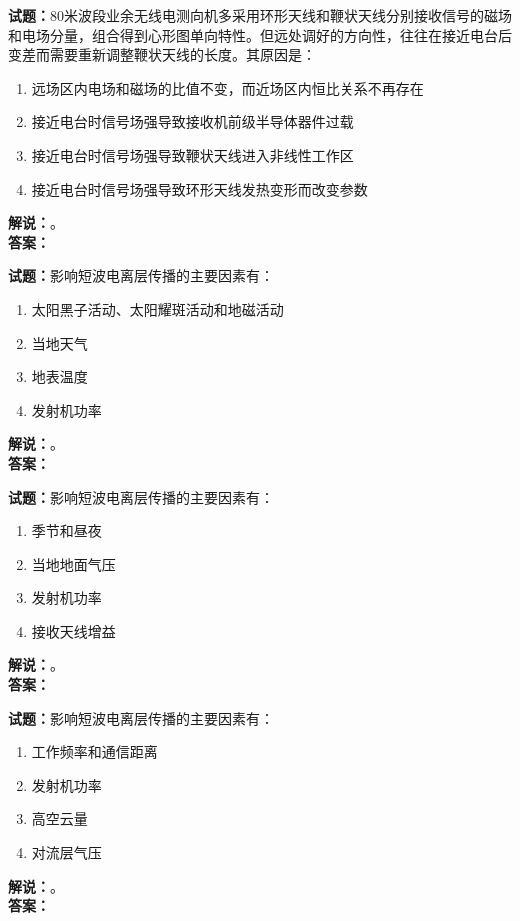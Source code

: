 \documentclass{ctexbook}
\begin{document}
\noindent\textbf{试题：}80米波段业余无线电测向机多采用环形天线和鞭状天线分别接收信号的磁场和电场分量，组合得到心形图单向特性。但远处调好的方向性，往往在接近电台后变差而需要重新调整鞭状天线的长度。其原因是：
\begin{enumerate}[leftmargin=3em]
  \item 远场区内电场和磁场的比值不变，而近场区内恒比关系不再存在
  \item 接近电台时信号场强导致接收机前级半导体器件过载
  \item 接近电台时信号场强导致鞭状天线进入非线性工作区
  \item 接近电台时信号场强导致环形天线发热变形而改变参数
\end{enumerate}
\noindent\textbf{解说：}\textbf{}。\\\noindent\textbf{答案：}

\vspace{\baselineskip}

\noindent\textbf{试题：}影响短波电离层传播的主要因素有：
\begin{enumerate}[leftmargin=3em]
  \item 太阳黑子活动、太阳耀斑活动和地磁活动
  \item 当地天气
  \item 地表温度
  \item 发射机功率
\end{enumerate}
\noindent\textbf{解说：}\textbf{}。\\\noindent\textbf{答案：}

\vspace{\baselineskip}

\noindent\textbf{试题：}影响短波电离层传播的主要因素有：
\begin{enumerate}[leftmargin=3em]
  \item 季节和昼夜
  \item 当地地面气压
  \item 发射机功率
  \item 接收天线增益
\end{enumerate}
\noindent\textbf{解说：}\textbf{}。\\\noindent\textbf{答案：}

\vspace{\baselineskip}

\noindent\textbf{试题：}影响短波电离层传播的主要因素有：
\begin{enumerate}[leftmargin=3em]
  \item 工作频率和通信距离
  \item 发射机功率
  \item 高空云量
  \item 对流层气压
\end{enumerate}
\noindent\textbf{解说：}\textbf{}。\\\noindent\textbf{答案：}
\end{document}
